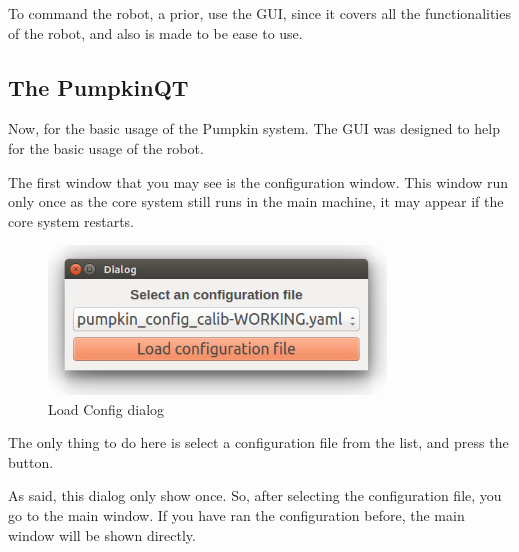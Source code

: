 \documentclass[oneside,a4paper,titlepage]{article}
\begin{document}
To command the robot, a prior, use the GUI, since it covers all the functionalities of the robot, and also is made to be ease to use.

\subsection{The PumpkinQT}

Now, for the basic usage of the Pumpkin system. The GUI was designed to help for the basic usage of the robot.

The first window that you may see is the configuration window. This window run only once as the core system still runs in the main machine, it may appear if the core system restarts.

\begin{figure}[ht!]
	\centering
	\includegraphics[width=0.8\textwidth]{load_config}
	\caption{Load Config dialog}
	\label{fig:load_config}
\end{figure}

The only thing to do here is select a configuration file from the list, and press the button.

As said, this dialog only show once. So, after selecting the configuration file, you go to the main window. If you have ran the configuration before, the main window will be shown directly.
\end{document}
